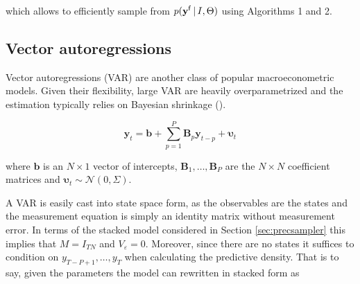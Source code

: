 \documentclass[notitlepage,a4paper,12pt]{article}
\begin{document}
which allows to efficiently sample from $p(\mathbf{y}^{\sf{f}}\,|\, I, \Theta)$ using Algorithms 1 and 2. 

\subsection{Vector autoregressions}\label{sec:var}

Vector autoregressions (VAR) are another class of popular macroeconometric models. Given their flexibility, large VAR are heavily overparametrized and the estimation typically relies on Bayesian shrinkage (). 

\begin{equation}\label{eqn:var}
    \mathbf{y}_t = \mathbf{b} + \sum_{p=1}^P \mathbf{B}_p \mathbf{y}_{t-p} + \boldsymbol{\upsilon}_t
\end{equation}

where $\mathbf{b}$ is an $N \times 1$ vector of intercepts, $\mathbf{B}_1, \dots, \mathbf{B}_P$ are the $N \times N$ coefficient matrices and $\boldsymbol{\upsilon}_t \sim \mathcal{N}(0, \Sigma)$.

A VAR is easily cast into state space form, as the observables are the states and the measurement equation is simply an identity matrix without measurement error. In terms of the stacked model considered in Section \ref{sec:precsampler} this implies that $M = I_{TN}$ and $V_{\varepsilon} = 0$. Moreover, since there are no states it suffices to condition on $y_{T-P+1}, \dots, y_{T}$ when calculating the predictive density. That is to say, given the parameters the model can rewritten in stacked form as
\end{document}
